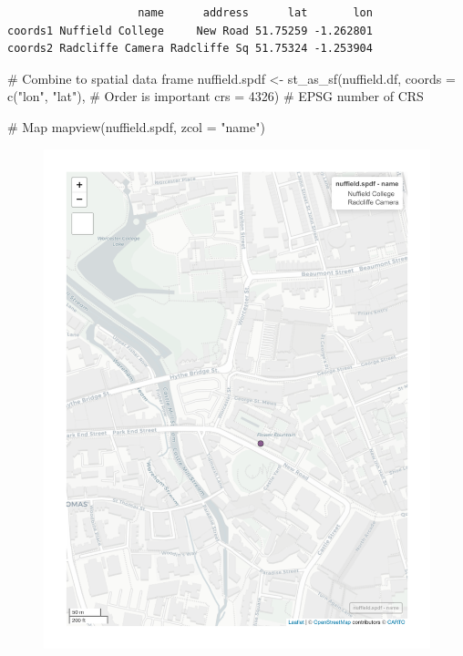 \documentclass[
  letterpaper,
  DIV=11,
  numbers=noendperiod]{scrreprt}
\newenvironment{Shaded}{\begin{snugshade}}{\end{snugshade}}
\newcommand{\AttributeTok}[1]{\textcolor[rgb]{0.40,0.45,0.13}{#1}}
\newcommand{\CommentTok}[1]{\textcolor[rgb]{0.37,0.37,0.37}{#1}}
\newcommand{\DecValTok}[1]{\textcolor[rgb]{0.68,0.00,0.00}{#1}}
\newcommand{\FunctionTok}[1]{\textcolor[rgb]{0.28,0.35,0.67}{#1}}
\newcommand{\NormalTok}[1]{\textcolor[rgb]{0.00,0.23,0.31}{#1}}
\newcommand{\OtherTok}[1]{\textcolor[rgb]{0.00,0.23,0.31}{#1}}
\newcommand{\StringTok}[1]{\textcolor[rgb]{0.13,0.47,0.30}{#1}}
\begin{document}
\begin{verbatim}
                    name      address      lat       lon
coords1 Nuffield College     New Road 51.75259 -1.262801
coords2 Radcliffe Camera Radcliffe Sq 51.75324 -1.253904
\end{verbatim}

\begin{Shaded}
\begin{Highlighting}[]
\CommentTok{\# Combine to spatial data frame}
\NormalTok{nuffield.spdf }\OtherTok{\textless{}{-}} \FunctionTok{st\_as\_sf}\NormalTok{(nuffield.df, }
                          \AttributeTok{coords =} \FunctionTok{c}\NormalTok{(}\StringTok{"lon"}\NormalTok{, }\StringTok{"lat"}\NormalTok{), }\CommentTok{\# Order is important}
                          \AttributeTok{crs =} \DecValTok{4326}\NormalTok{) }\CommentTok{\# EPSG number of CRS}

\CommentTok{\# Map}
\FunctionTok{mapview}\NormalTok{(nuffield.spdf, }\AttributeTok{zcol =} \StringTok{"name"}\NormalTok{)}
\end{Highlighting}
\end{Shaded}

\begin{figure}[H]

{\centering \includegraphics{01_refresher_files/figure-pdf/unnamed-chunk-4-1.pdf}

}

\end{figure}
\end{document}
